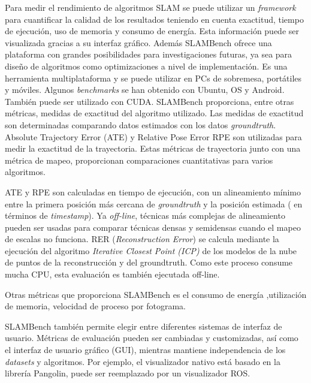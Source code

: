 \begin {enumerate}
Para medir el rendimiento de algoritmos SLAM se puede utilizar un \textit{framework} para cuantificar la calidad de los resultados teniendo en cuenta exactitud, tiempo de ejecución, uso de memoria y consumo de energía. Esta información puede ser visualizada gracias a su interfaz gráfico.
Además SLAMBench ofrece una plataforma con grandes posibilidades para investigaciones futuras, ya sea para diseño de algoritmos como optimizaciones a nivel de implementación. Es una herramienta multiplataforma y se puede utilizar en PCs de sobremesa, portátiles y móviles. Algunos \textit{benchmarks} se han obtenido con Ubuntu, OS y Android.
También puede ser utilizado con CUDA.
SLAMBench proporciona, entre otras métricas, medidas de exactitud del algoritmo utilizado. Las medidas de exactitud son determinadas comparando datos estimados con los datos \textit{groundtruth}.
Absolute Trajectory Error (ATE) y Relative Pose Error RPE son utilizadas para medir la exactitud de la trayectoria. Estas métricas de trayectoria junto con una métrica de mapeo, proporcionan comparaciones cuantitativas para varios algoritmos.

ATE y RPE son calculadas en tiempo de ejecución, con un alineamiento mínimo entre la primera posición más cercana de \textit{groundtruth} y la posición estimada ( en términos de \textit{timestamp}). Ya \textit{off-line}, técnicas más complejas de alineamiento pueden ser usadas para comparar técnicas densas y semidensas cuando el mapeo de escalas no funciona. RER (\textit{Reconstruction Error}) se calcula mediante la ejecución del algoritmo \textit{Iterative Closest Point (ICP)} de los modelos de la nube de puntos de la reconstrucción y del groundtruth. Como este proceso consume mucha CPU, esta evaluación es también ejecutada off-line.

Otras métricas que proporciona SLAMBench es el consumo de energía ,utilización de memoria, velocidad de proceso por fotograma.

SLAMBench también permite elegir entre diferentes sistemas de interfaz de usuario. Métricas de evaluación pueden ser cambiadas y customizadas, así como el interfaz de usuario gráfico (GUI), mientras mantiene independencia de los \textit{datasets} y algoritmos. Por ejemplo, el visualizador nativo está basado en la librería Pangolin, puede ser reemplazado por un visualizador ROS.


\end{enumerate}
